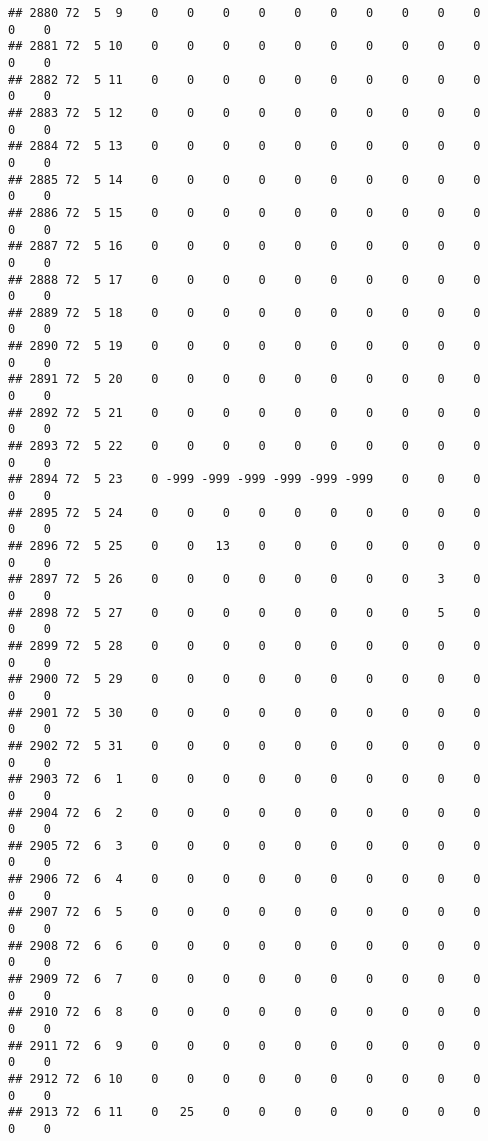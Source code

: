 \documentclass[]{article}
\begin{document}
\begin{verbatim}
## 2880 72  5  9    0    0    0    0    0    0    0    0    0    0    0    0
## 2881 72  5 10    0    0    0    0    0    0    0    0    0    0    0    0
## 2882 72  5 11    0    0    0    0    0    0    0    0    0    0    0    0
## 2883 72  5 12    0    0    0    0    0    0    0    0    0    0    0    0
## 2884 72  5 13    0    0    0    0    0    0    0    0    0    0    0    0
## 2885 72  5 14    0    0    0    0    0    0    0    0    0    0    0    0
## 2886 72  5 15    0    0    0    0    0    0    0    0    0    0    0    0
## 2887 72  5 16    0    0    0    0    0    0    0    0    0    0    0    0
## 2888 72  5 17    0    0    0    0    0    0    0    0    0    0    0    0
## 2889 72  5 18    0    0    0    0    0    0    0    0    0    0    0    0
## 2890 72  5 19    0    0    0    0    0    0    0    0    0    0    0    0
## 2891 72  5 20    0    0    0    0    0    0    0    0    0    0    0    0
## 2892 72  5 21    0    0    0    0    0    0    0    0    0    0    0    0
## 2893 72  5 22    0    0    0    0    0    0    0    0    0    0    0    0
## 2894 72  5 23    0 -999 -999 -999 -999 -999 -999    0    0    0    0    0
## 2895 72  5 24    0    0    0    0    0    0    0    0    0    0    0    0
## 2896 72  5 25    0    0   13    0    0    0    0    0    0    0    0    0
## 2897 72  5 26    0    0    0    0    0    0    0    0    3    0    0    0
## 2898 72  5 27    0    0    0    0    0    0    0    0    5    0    0    0
## 2899 72  5 28    0    0    0    0    0    0    0    0    0    0    0    0
## 2900 72  5 29    0    0    0    0    0    0    0    0    0    0    0    0
## 2901 72  5 30    0    0    0    0    0    0    0    0    0    0    0    0
## 2902 72  5 31    0    0    0    0    0    0    0    0    0    0    0    0
## 2903 72  6  1    0    0    0    0    0    0    0    0    0    0    0    0
## 2904 72  6  2    0    0    0    0    0    0    0    0    0    0    0    0
## 2905 72  6  3    0    0    0    0    0    0    0    0    0    0    0    0
## 2906 72  6  4    0    0    0    0    0    0    0    0    0    0    0    0
## 2907 72  6  5    0    0    0    0    0    0    0    0    0    0    0    0
## 2908 72  6  6    0    0    0    0    0    0    0    0    0    0    0    0
## 2909 72  6  7    0    0    0    0    0    0    0    0    0    0    0    0
## 2910 72  6  8    0    0    0    0    0    0    0    0    0    0    0    0
## 2911 72  6  9    0    0    0    0    0    0    0    0    0    0    0    0
## 2912 72  6 10    0    0    0    0    0    0    0    0    0    0    0    0
## 2913 72  6 11    0   25    0    0    0    0    0    0    0    0    0    0

\end{verbatim}
\end{document}

